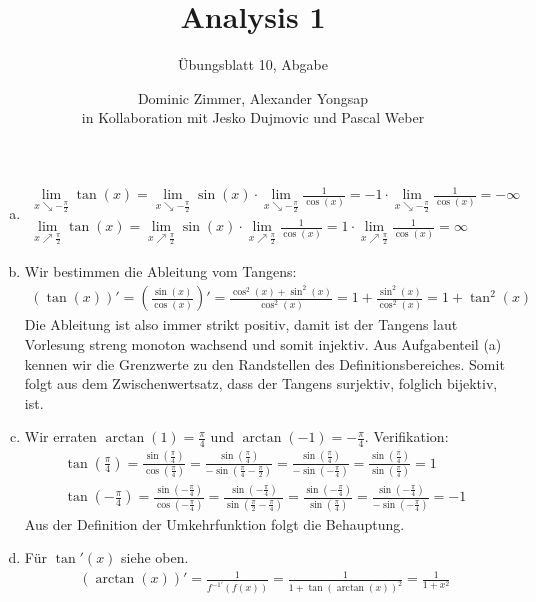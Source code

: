 \documentclass{scrreprt}
\begin{document}
	\title{Analysis 1}
 	\author{Dominic Zimmer, Alexander Yongsap\\in Kollaboration mit Jesko Dujmovic und Pascal Weber}
 	\subtitle{Übungsblatt 10, Abgabe}
 	\publishers{Übungsgruppe: Rami Ahmad}
  	\maketitle 


\begin{enumerate}[(a)]
\item
    \begin{align*}
        \lim\limits_{x \searrow -\frac{\pi}{2}} \tan(x) = \lim\limits_{x \searrow -\frac{\pi}{2}} \sin(x) \cdot \lim\limits_{x \searrow -\frac{\pi}{2}} \frac{1}{\cos(x)} = -1 \cdot \lim\limits_{x \searrow -\frac{\pi}{2}} \frac{1}{\cos(x)} = -\infty\\
        \lim\limits_{x \nearrow \frac{\pi}{2}} \tan(x) = \lim\limits_{x \nearrow \frac{\pi}{2}} \sin(x) \cdot \lim\limits_{x \nearrow \frac{\pi}{2}} \frac{1}{\cos(x)} = 1 \cdot \lim\limits_{x \nearrow \frac{\pi}{2}} \frac{1}{\cos(x)} = \infty
    \end{align*}
\item
  Wir bestimmen die Ableitung vom Tangens:
  \begin{align*}
    (\tan(x))' = \left(\frac{\sin(x)}{\cos(x)}\right)' = \frac{\cos^2(x)+\sin^2(x)}{\cos^2(x)} = 1 + \frac{\sin^2(x)}{\cos^2(x)} = 1 + \tan^2(x)
  \end{align*}
  Die Ableitung ist also immer strikt positiv, damit ist der Tangens laut Vorlesung streng monoton wachsend und somit injektiv. Aus Aufgabenteil (a) kennen wir die Grenzwerte zu den Randstellen des Definitionsbereiches. Somit folgt aus dem Zwischenwertsatz, dass der Tangens surjektiv, folglich bijektiv, ist.
\item
  Wir erraten $\arctan(1) = \frac{\pi}{4}$ und $\arctan(-1) = -\frac{\pi}{4}$. Verifikation:
  \begin{align*}
    \tan(\frac{\pi}{4})= \frac{\sin(\frac{\pi}{4})}{\cos(\frac{\pi}{4})} = \frac{\sin(\frac{\pi}{4})}{-\sin(\frac{\pi}{4}-\frac{\pi}{2})} = \frac{\sin(\frac{\pi}{4})}{-\sin(-\frac{\pi}{4})} = \frac{\sin(\frac{\pi}{4})}{\sin(\frac{\pi}{4})} = 1\\
    \tan(-\frac{\pi}{4})= \frac{\sin(-\frac{\pi}{4})}{\cos(-\frac{\pi}{4})} = \frac{\sin(-\frac{\pi}{4})}{\sin(\frac{\pi}{2}-\frac{\pi}{4})} = \frac{\sin(-\frac{\pi}{4})}{\sin(\frac{\pi}{4})} = \frac{\sin(-\frac{\pi}{4})}{-\sin(-\frac{\pi}{4})} = - 1
  \end{align*}
  Aus der Definition der Umkehrfunktion folgt die Behauptung.
\item
  Für $\tan'(x)$ siehe oben.
  \begin{align*}
    (\arctan(x))' = \frac{1}{f^{-1'} (f(x))} = \frac{1}{1 + \tan(\arctan(x))^2} = \frac{1}{1 + x^2}
  \end{align*}
 \end{enumerate} 
\end{document}
